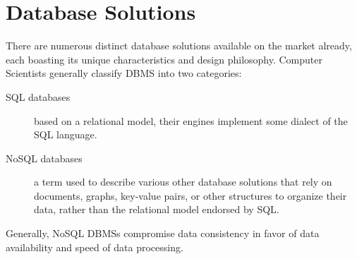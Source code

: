 \chapter{Database Solutions}
\label{ch:background}
\par There are numerous distinct database solutions available on the market already, each boasting its unique characteristics and design philosophy. Computer Scientists generally classify DBMS into two categories:
\begin{description}
  \item[SQL databases] based on a relational model, their engines implement some dialect of the SQL language.
  \item[NoSQL databases] a term used to describe various other database solutions that rely on documents, graphs, key-value pairs, or other structures to organize their data, rather than the relational model endorsed by SQL\citep{SQLvNOSQL}.
\end{description}

\par Generally, NoSQL DBMSs compromise data consistency in favor of data availability and speed of data processing.

%
